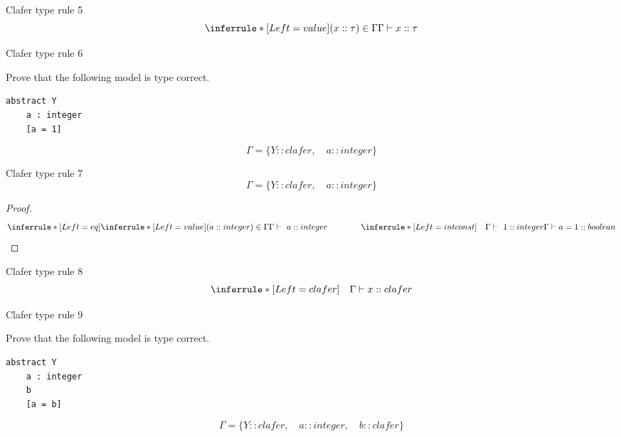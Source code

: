 \documentclass[table,15pt,t]{beamer}
\begin{document}
\begin{frame}[fragile,c]{Clafer type rule 5}
\begin{equation*}
\inferrule* [Left=value] {(x::\tau)\in\Gamma}{\Gamma\vdash x::\tau}
\end{equation*}
\end{frame}

\begin{frame}[fragile,c]{Clafer type rule 6}

 Prove that the following model is type correct.

\begin{lstlisting}
abstract Y
    a : integer
    [a = 1]
\end{lstlisting}

\begin{equation*}
\Gamma = \{Y::clafer,\quad a::integer\}
\end{equation*}
\end{frame}

\begin{frame}[fragile,c]{Clafer type rule 7}
\begin{equation*}
\Gamma = \{Y::clafer,\quad a::integer\}
\end{equation*}

\begin{proof}
\begin{equation*}
\inferrule* [Left=eq] {
  \inferrule* [Left=value]{(a::integer)\in\Gamma}{\Gamma\vdash\ a::integer} \\ \hspace{40pt} 
  \inferrule* [Left=intconst]{\quad}{\Gamma\vdash\ 1::integer}}
{\Gamma\vdash a = 1::boolean}
\end{equation*}
\end{proof}
\end{frame}

\begin{frame}[fragile,c]{Clafer type rule 8}
\begin{equation*}
\inferrule* [Left=clafer] {\quad}{\Gamma\vdash x::clafer}
\end{equation*}
\end{frame}

\begin{frame}[fragile,c]{Clafer type rule 9}

 Prove that the following model is type correct.

\begin{lstlisting}
abstract Y
    a : integer
    b
    [a = b]
\end{lstlisting}

\begin{equation*}
\Gamma = \{Y::clafer,\quad a::integer,\quad b::clafer\}
\end{equation*}
\end{frame}
\end{document}
